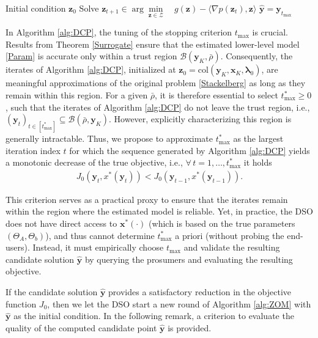 \documentclass[letterpaper, 10 pt, conference]{ieeeconf}
\newcommand\xbf{\mathbf{x}}
\newcommand\ybf{\mathbf{y}}
\newcommand\zbf{\mathbf{z}}
\newcommand\lambdabf{\boldsymbol{\lambda}}
\begin{document}
\begin{algorithm}
\caption{Difference of Convex Programs \cite[Eq. (11)]{tao1997convex}} \label{alg:DCP}
\begin{algorithmic}[1]
   \Require Initial condition $\zbf_0$
   \State Solve $\zbf_{t+1} \in \arg \min\limits_{\zbf \in \mathcal{Z} }\quad {g(\zbf)- \langle \nabla p(\zbf_t),\zbf\rangle}$
   \EndWhile
   \Ensure $\hat{\ybf}=\ybf_{t_{\max}}$
\end{algorithmic}
\end{algorithm}

In Algorithm \ref{alg:DCP}, the tuning of the stopping criterion $t_{\max}$ is crucial. Results from Theorem \ref{Surrogate} ensure that the estimated lower-level model \eqref{Param} is accurate only within a trust region $\mathcal{B}(\ybf_{K},\bar{\rho})$. Consequently, the iterates of Algorithm \ref{alg:DCP}, initialized at $\zbf_0 = \mathrm{col}\left(\ybf_{K}, \xbf_{K}, \lambdabf_0\right)$, are meaningful approximations of the original problem \eqref{Stackelberg} as long as they remain within this region. For a given $\bar{\rho}$, it is therefore essential to select $t^*_{\max} \geq 0$, such that the iterates of Algorithm \ref{alg:DCP} do not leave the trust region, i.e., $\left(\ybf_t\right)_{t \in [t^*_{\max}]} \subseteq \mathcal{B}(\bar{\rho}, \ybf_{K})$. However, explicitly characterizing this region is generally intractable. Thus, we propose to approximate $t^*_{\max}$ as the largest iteration index $t$ for which the sequence generated by Algorithm \ref{alg:DCP} yields a monotonic decrease of the true objective, i.e., $\forall\, t=1,\dots, t^*_{\max}$ it holds
\begin{align}\label{Crit}
    J_0(\ybf_t, x^*(\ybf_t)) < J_0(\ybf_{t-1}, x^*(\ybf_{t-1})).
\end{align}

This criterion serves as a practical proxy to ensure that the iterates remain within the region where the estimated model is reliable.
Yet, in practice, the DSO does not have direct access to $\xbf^*(\cdot)$ (which is based on the true parameters $(\Theta_A, \Theta_b)$), and thus cannot determine $t^*_{\max}$ a priori (without probing the end-users). Instead, it must empirically choose $t_{\max}$ and validate the resulting candidate solution $\hat{\ybf}$ by querying the prosumers and evaluating the resulting objective.

If the candidate solution $\hat{\ybf}$ provides a satisfactory reduction in the objective function $J_0$, then we let the DSO start a new round of Algorithm \ref{alg:ZOM} with $\hat{\ybf}$ as the initial condition. In the following remark, a criterion to evaluate the quality of the computed candidate point $\hat{\ybf}$ is provided.
\end{document}
